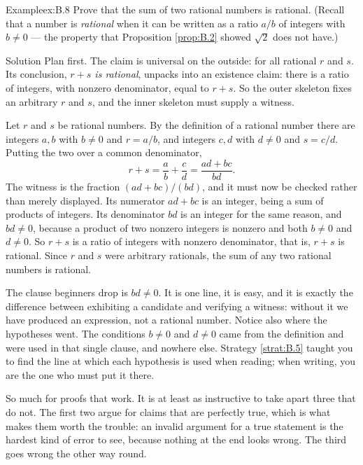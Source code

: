 \documentclass[a4paper,12pt,oneside]{memoir}
\begin{document}
\begin{workedexample}
\begin{envexample}{Example}{ex:B.8}{}
Prove that the sum of two rational numbers is rational. (Recall that a number is \emph{rational} when it can be written as a ratio \(a/b\) of integers with \(b \neq 0\) — the property that Proposition \ref{prop:B.2} showed \(\sqrt{2}\) does not have.)
\end{envexample}
\begin{envsolution}{Solution}{}{}
Plan first. The claim is universal on the outside: for all rational \(r\) and \(s\). Its conclusion, \emph{\(r + s\) is rational}, unpacks into an existence claim: there is a ratio of integers, with nonzero denominator, equal to \(r + s\). So the outer skeleton fixes an arbitrary \(r\) and \(s\), and the inner skeleton must supply a witness.

Let \(r\) and \(s\) be rational numbers. By the definition of a rational number there are integers \(a, b\) with \(b \neq 0\) and \(r = a/b\), and integers \(c, d\) with \(d \neq 0\) and \(s = c/d\). Putting the two over a common denominator, \[ r + s = \frac{a}{b} + \frac{c}{d} = \frac{ad + bc}{bd}. \] The witness is the fraction \((ad + bc)/(bd)\), and it must now be checked rather than merely displayed. Its numerator \(ad + bc\) is an integer, being a sum of products of integers. Its denominator \(bd\) is an integer for the same reason, and \(bd \neq 0\), because a product of two nonzero integers is nonzero and both \(b \neq 0\) and \(d \neq 0\). So \(r + s\) is a ratio of integers with nonzero denominator, that is, \(r + s\) is rational. Since \(r\) and \(s\) were arbitrary rationals, the sum of any two rational numbers is rational.

The clause beginners drop is \(bd \neq 0\). It is one line, it is easy, and it is exactly the difference between exhibiting a candidate and verifying a witness: without it we have produced an expression, not a rational number. Notice also where the hypotheses went. The conditions \(b \neq 0\) and \(d \neq 0\) came from the definition and were used in that single clause, and nowhere else. Strategy \ref{strat:B.5} taught you to find the line at which each hypothesis is used when reading; when writing, you are the one who must put it there.
\end{envsolution}
\end{workedexample}
So much for proofs that work. It is at least as instructive to take apart three that do not. The first two argue for claims that are perfectly true, which is what makes them worth the trouble: an invalid argument for a true statement is the hardest kind of error to see, because nothing at the end looks wrong. The third goes wrong the other way round.
\end{document}
